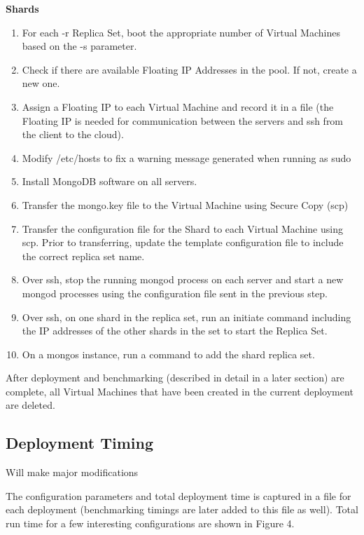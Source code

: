 \documentclass[9pt,twocolumn,twoside]{styles/osajnl}
\begin{document}
\textbf{Shards}
\vspace{-\topsep}
\begin{enumerate}
\item For each -r Replica Set, boot the appropriate number of Virtual Machines based on the -s parameter.
\item Check if there are available Floating IP Addresses in the pool.  If not, create a new one.
\item Assign a Floating IP to each Virtual Machine and record it in a file (the Floating IP is needed for communication between the servers and ssh from the client to the cloud).
\item Modify /etc/hosts to fix a warning message generated when running as sudo
\item Install MongoDB software on all servers.
\item Transfer the mongo.key file to the Virtual Machine using Secure Copy (scp)
\item Transfer the configuration file for the Shard to each Virtual Machine using scp.  Prior to transferring, update the template configuration file to include the correct replica set name.
\item Over ssh, stop the running mongod process on each server and start a new mongod processes using the configuration file sent in the previous step.
\item Over ssh, on one shard in the replica set, run an initiate command including the IP addresses of the other shards in the set to start the Replica Set.
\item On a mongos instance, run a command to add the shard replica set.
\end{enumerate}
\vspace{-\topsep}



After deployment and benchmarking (described in detail in a later section) are complete, all Virtual Machines that have been created in the current deployment are deleted.

\subsection{Deployment Timing}

Will make major modifications

The configuration parameters and total deployment time is captured in a file for each deployment (benchmarking timings are later added to this file as well).  Total run time for a few interesting configurations are shown in Figure 4.  
\end{document}

